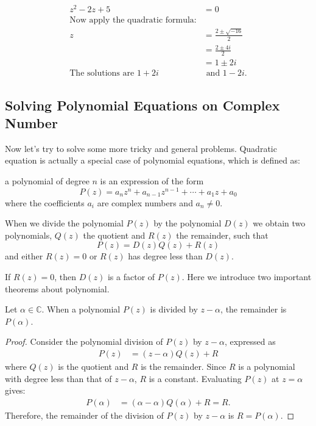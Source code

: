 $$\begin{aligned}
    z^2 - 2z + 5 &= 0 \\
    \text{Now apply the quadratic formula:} \\
    z &= \frac{2 \pm \sqrt{-16}}{2} \\
    &= \frac{2 \pm 4i}{2} \\
    &= 1 \pm 2i \\
    \text{The solutions are } 1 + 2i &\text{ and } 1 - 2i.
\end{aligned}$$

\subsection{Solving Polynomial Equations on Complex Number}
Now let's try to solve some more tricky and general problems. Quadratic equation is actually a special case of
polynomial equations, which is defined as:
\begin{definition}
    a polynomial of degree $n$ is an expression of the form 
    $$P(z)=a_nz^n+a_{n-1}z^{n-1}+\cdots+a_1z+a_0$$
    where the coefficients $a_i$ are complex numbers and $a_n \neq 0$.
\end{definition}
When we divide the polynomial \( P(z) \) by the polynomial \( D(z) \) we obtain two polynomials, \( Q(z) \) the quotient and \( R(z) \) the remainder, such that
\[
P(z) = D(z)Q(z) + R(z)
\]
and either \( R(z) = 0 \) or \( R(z) \) has degree less than \( D(z) \).

If \( R(z) = 0 \), then \( D(z) \) is a factor of \( P(z) \).
Here we introduce two important theorems about polynomial.
\begin{theorem}
    Let \(\alpha \in \mathbb{C}\). When a polynomial \(P(z)\) is divided by \(z - \alpha\), the remainder is \(P(\alpha)\).
\end{theorem}
\begin{proof}
    Consider the polynomial division of \( P(z) \) by \( z - \alpha \), expressed as
    \begin{equation}
    \begin{aligned}
        P(z) &= (z - \alpha)Q(z) + R
    \end{aligned}
    \end{equation}
    where \( Q(z) \) is the quotient and \( R \) is the remainder. Since \( R \) is a polynomial with degree less than that of \( z - \alpha \), \( R \) is a constant. Evaluating \( P(z) \) at \( z = \alpha \) gives:
    \begin{equation}
    \begin{aligned}
        P(\alpha) &= (\alpha - \alpha)Q(\alpha) + R = R.
    \end{aligned}
    \end{equation}
    Therefore, the remainder of the division of \( P(z) \) by \( z - \alpha \) is \( R = P(\alpha) \).
    \end{proof}

